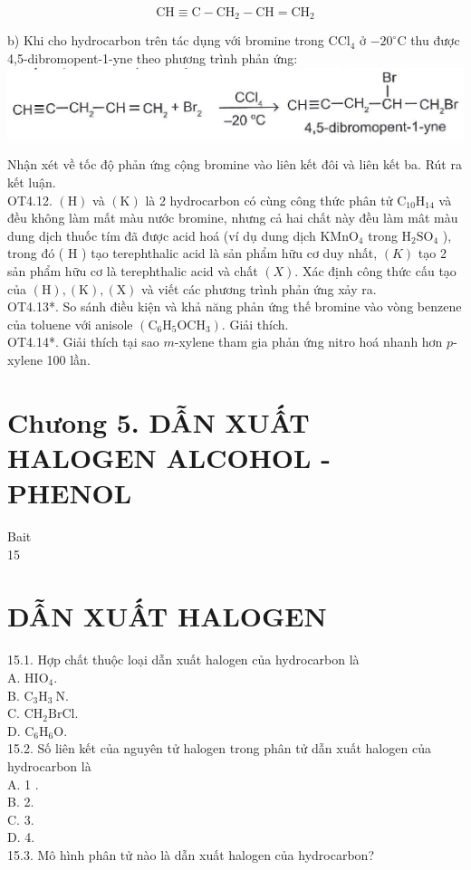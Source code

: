 \documentclass[10pt]{article}
\begin{document}
$$
\mathrm{CH} \equiv \mathrm{C}-\mathrm{CH}_{2}-\mathrm{CH}=\mathrm{CH}_{2}
$$

b) Khi cho hydrocarbon trên tác dụng với bromine trong $\mathrm{CCl}_{4}$ ở $-20^{\circ} \mathrm{C}$ thu được 4,5-dibromopent-1-yne theo phương trình phản ứng:\\
\includegraphics[max width=\textwidth, center]{2025_10_23_ae7aef68fb3b41082d29g-32(2)}

Nhận xét về tốc độ phản ứng cộng bromine vào liên kết đôi và liên kết ba. Rút ra kết luận.\\
OT4.12. $(\mathrm{H})$ và $(\mathrm{K})$ là 2 hydrocarbon có cùng công thức phân tử $\mathrm{C}_{10} \mathrm{H}_{14}$ và đều không làm mất màu nước bromine, nhưng cả hai chất này đều làm mât màu dung dịch thuốc tím đã được acid hoá (ví dụ dung dịch $\mathrm{KMnO}_{4}$ trong $\mathrm{H}_{2} \mathrm{SO}_{4}$ ), trong đó ( H ) tạo terephthalic acid là sản phẩm hữu cơ duy nhất, $(K)$ tạo 2 sản phẩm hữu cơ là terephthalic acid và chất $(X)$. Xác định công thức cấu tạo của $(\mathrm{H}),(\mathrm{K}),(\mathrm{X})$ và viết các phương trình phản ứng xảy ra.\\
OT4.13*. So sánh điều kiện và khả năng phản ứng thế bromine vào vòng benzene của toluene với anisole $\left(\mathrm{C}_{6} \mathrm{H}_{5} \mathrm{OCH}_{3}\right)$. Giải thích.\\
OT4.14*. Giải thích tại sao $m$-xylene tham gia phản ứng nitro hoá nhanh hơn $p$-xylene 100 lần.

\section*{Chưong 5. DẪN XUẤT HALOGEN ALCOHOL - PHENOL}
Bait\\
15

\section*{DẪN XUẤT HALOGEN}
15.1. Hợp chất thuộc loại dẫn xuất halogen của hydrocarbon là\\
A. $\mathrm{HIO}_{4}$.\\
B. $\mathrm{C}_{3} \mathrm{H}_{3} \mathrm{~N}$.\\
C. $\mathrm{CH}_{2} \mathrm{BrCl}$.\\
D. $\mathrm{C}_{6} \mathrm{H}_{6} \mathrm{O}$.\\
15.2. Số liên kết của nguyên tử halogen trong phân tử dẫn xuất halogen của hydrocarbon là\\
A. 1 .\\
B. 2.\\
C. 3.\\
D. 4.\\
15.3. Mô hình phân tử nào là dẫn xuất halogen của hydrocarbon?
\end{document}
